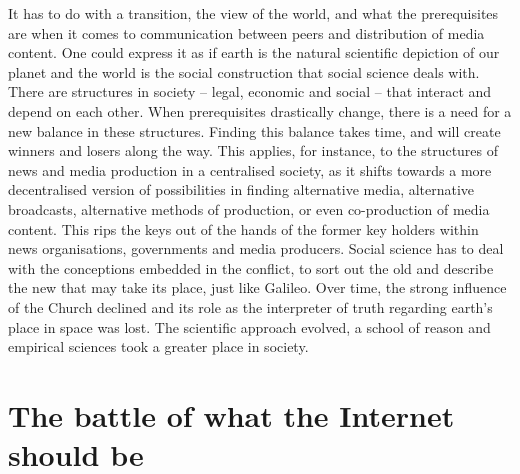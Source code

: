 It has to do with a transition, the view of the world, and what the
prerequisites are when it comes to communication between peers and distribution
of media content. One could express it as if earth is the natural scientif\hbox{}ic
depiction of our planet and the world is the social construction that social
science deals with. There are structures in society –  legal, economic and
social – that interact and depend on each other. When prerequisites drastically
change, there is a need for a new balance in these structures. F\hbox{}inding this
balance takes time, and will create winners and losers along the way. This
applies, for instance, to the structures of news and media production in a
centralised society, as it shifts towards a more decentralised version of
possibilities in f\hbox{}inding alternative media, alternative broadcasts, alternative
methods of production, or even co-production of media content. This rips the
keys out of the hands of the former key holders within news organisations,
governments and media producers. Social science has to deal with the conceptions
embedded in the conf\hbox{}lict, to sort out the old and describe the new that may take
its place, just like Galileo. Over time, the strong inf\hbox{}luence of the Church
declined and its role as the interpreter of truth regarding earth's place in
space was lost. The scientif\hbox{}ic approach evolved, a school of reason and
empirical sciences took a greater place in society.


\section{The battle of what the Internet should be}
\label{s:darling_conceptions:battle_internet}

